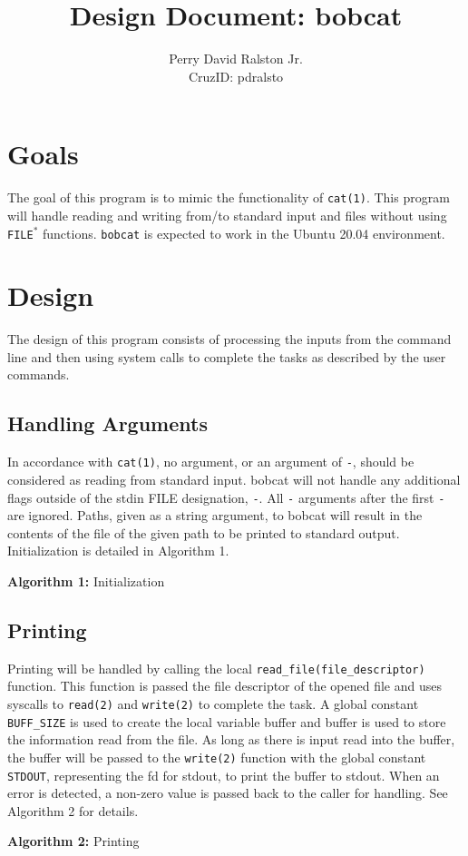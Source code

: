 \documentclass[11pt,letterpaper]{article}
\title{Design Document: bobcat}
\author{Perry David Ralston Jr.\\ CruzID: pdralsto}
\begin{document}
\maketitle
\thispagestyle{fancy}
\section{Goals}
The goal of this program is to mimic the functionality of \texttt{cat(1)}. This program will handle reading and writing from/to standard input and files without using \texttt{FILE${^*}$} functions. \texttt{bobcat} is expected to work in the Ubuntu 20.04 environment.

\section{Design}
The design of this program consists of processing the inputs from the command line and then using system calls to complete the tasks as described by the user commands.
\subsection{Handling Arguments}
In accordance with \texttt{cat(1)}, no argument, or an argument of \texttt{-}, should be considered as reading from standard input. bobcat will not handle any additional flags outside of the stdin FILE designation, \texttt{-}. All \texttt{-} arguments after the first \texttt{-} are ignored. Paths, given as a string argument, to bobcat will result in the contents of the file of the given path to be printed to standard output. Initialization is detailed in Algorithm 1. 

\begin{minipage}{\linewidth}
	
	\vspace{-.5cm}\begin{center}
	\footnotesize{\textbf{Algorithm 1:} Initialization}
	\end{center}
\end{minipage}

\subsection{Printing}
Printing will be handled by calling the local \texttt{read\_file(file\_descriptor)} function. This function is passed the file descriptor of the opened file and uses syscalls to \texttt{read(2)} and \texttt{write(2)} to complete the task. A global constant \texttt{BUFF\_SIZE} is used to create the local variable buffer and buffer is used to store the information read from the file. As long as there is input read into the buffer, the buffer will be passed to the \texttt{write(2)} function with the global constant \texttt{STDOUT}, representing the fd for stdout, to print the buffer to stdout. When an error is detected, a non-zero value is passed back to the caller for handling. See Algorithm 2 for details.

\vspace{.5cm}\begin{minipage}{\linewidth}
	
	\vspace{-.5cm}\begin{center}
	\footnotesize{\textbf{Algorithm 2:} Printing}
	\end{center}
\end{minipage}
\end{document}
